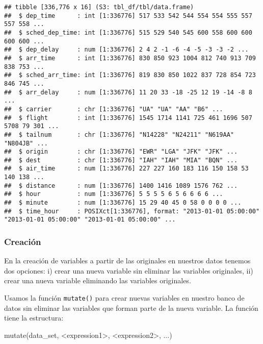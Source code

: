 \documentclass[
]{book}
\newenvironment{Shaded}{\begin{snugshade}}{\end{snugshade}}
\newcommand{\FunctionTok}[1]{\textcolor[rgb]{0.00,0.00,0.00}{#1}}
\newcommand{\NormalTok}[1]{#1}
\newcommand{\SpecialCharTok}[1]{\textcolor[rgb]{0.00,0.00,0.00}{#1}}
\begin{document}
\begin{verbatim}
## tibble [336,776 x 16] (S3: tbl_df/tbl/data.frame)
##  $ dep_time      : int [1:336776] 517 533 542 544 554 554 555 557 557 558 ...
##  $ sched_dep_time: int [1:336776] 515 529 540 545 600 558 600 600 600 600 ...
##  $ dep_delay     : num [1:336776] 2 4 2 -1 -6 -4 -5 -3 -3 -2 ...
##  $ arr_time      : int [1:336776] 830 850 923 1004 812 740 913 709 838 753 ...
##  $ sched_arr_time: int [1:336776] 819 830 850 1022 837 728 854 723 846 745 ...
##  $ arr_delay     : num [1:336776] 11 20 33 -18 -25 12 19 -14 -8 8 ...
##  $ carrier       : chr [1:336776] "UA" "UA" "AA" "B6" ...
##  $ flight        : int [1:336776] 1545 1714 1141 725 461 1696 507 5708 79 301 ...
##  $ tailnum       : chr [1:336776] "N14228" "N24211" "N619AA" "N804JB" ...
##  $ origin        : chr [1:336776] "EWR" "LGA" "JFK" "JFK" ...
##  $ dest          : chr [1:336776] "IAH" "IAH" "MIA" "BQN" ...
##  $ air_time      : num [1:336776] 227 227 160 183 116 150 158 53 140 138 ...
##  $ distance      : num [1:336776] 1400 1416 1089 1576 762 ...
##  $ hour          : num [1:336776] 5 5 5 5 6 5 6 6 6 6 ...
##  $ minute        : num [1:336776] 15 29 40 45 0 58 0 0 0 0 ...
##  $ time_hour     : POSIXct[1:336776], format: "2013-01-01 05:00:00" "2013-01-01 05:00:00" "2013-01-01 05:00:00" ...
\end{verbatim}

\hypertarget{creaciuxf3n}{%
\subsubsection{Creación}\label{creaciuxf3n}}

En la creación de variables a partir de las originales en nuestros datos tenemos dos opciones: i) crear una nueva variable sin eliminar las variables originales, ii) crear una nueva variable eliminando las variables originales.

Usamos la función \texttt{mutate()} para crear nuevas variables en nuestro banco de datos sin eliminar las variables que forman parte de la nueva variable. La función tiene la estructura:

\begin{Shaded}
\begin{Highlighting}[]
\FunctionTok{mutate}\NormalTok{(data\_set, }\SpecialCharTok{\textless{}}\NormalTok{expression1}\SpecialCharTok{\textgreater{}}\NormalTok{, }\SpecialCharTok{\textless{}}\NormalTok{expression2}\SpecialCharTok{\textgreater{}}\NormalTok{, ...)}
\end{Highlighting}
\end{Shaded}
\end{document}
